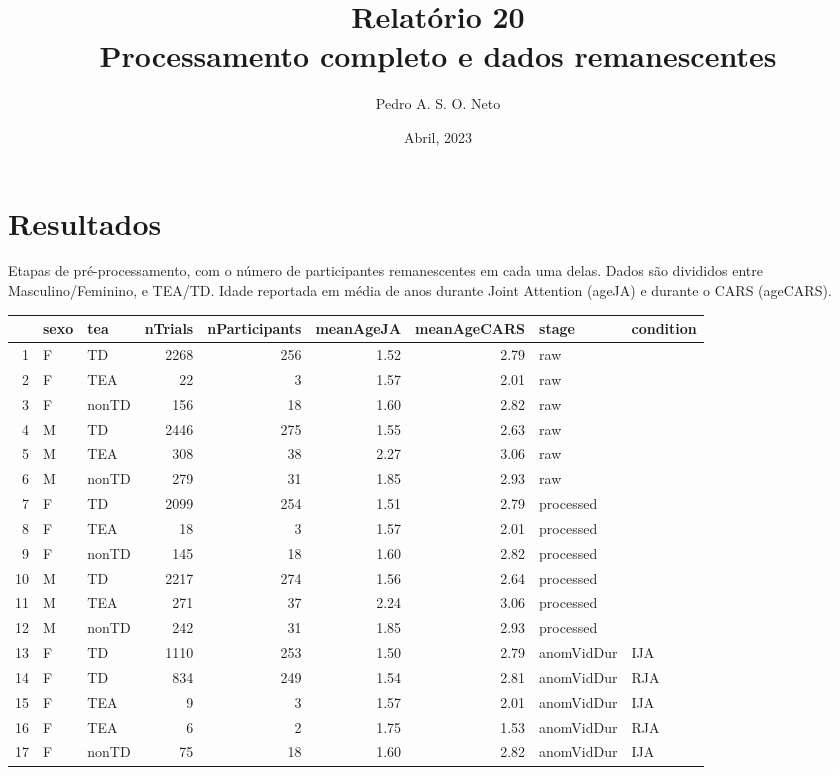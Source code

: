 \documentclass{article}
\title{Relatório 20 \\ Processamento completo e dados remanescentes}
\author{Pedro A. S. O. Neto}
\date{Abril, 2023}
\begin{document}
\maketitle

\section{Resultados}

Etapas de pré-processamento, com o número de participantes remanescentes em cada uma delas. Dados são divididos entre Masculino/Feminino, e TEA/TD. Idade reportada em média de anos durante Joint Attention (ageJA) e durante o CARS (ageCARS).
  \begin{table}[ht]
  \begin{tabular}{rllrrrrll}
    \hline
   & sexo & tea & nTrials & nParticipants & meanAgeJA & meanAgeCARS & stage & condition \\ 
    \hline
  1 & F & TD & 2268 & 256 & 1.52 & 2.79 & raw &  \\ 
    2 & F & TEA &  22 &   3 & 1.57 & 2.01 & raw &  \\ 
    3 & F & nonTD & 156 &  18 & 1.60 & 2.82 & raw &  \\ 
    4 & M & TD & 2446 & 275 & 1.55 & 2.63 & raw &  \\ 
    5 & M & TEA & 308 &  38 & 2.27 & 3.06 & raw &  \\ 
    6 & M & nonTD & 279 &  31 & 1.85 & 2.93 & raw &  \\ 
    7 & F & TD & 2099 & 254 & 1.51 & 2.79 & processed &  \\ 
    8 & F & TEA &  18 &   3 & 1.57 & 2.01 & processed &  \\ 
    9 & F & nonTD & 145 &  18 & 1.60 & 2.82 & processed &  \\ 
    10 & M & TD & 2217 & 274 & 1.56 & 2.64 & processed &  \\ 
    11 & M & TEA & 271 &  37 & 2.24 & 3.06 & processed &  \\ 
    12 & M & nonTD & 242 &  31 & 1.85 & 2.93 & processed &  \\ 
    13 & F & TD & 1110 & 253 & 1.50 & 2.79 & anomVidDur & IJA \\ 
    14 & F & TD & 834 & 249 & 1.54 & 2.81 & anomVidDur & RJA \\ 
    15 & F & TEA &   9 &   3 & 1.57 & 2.01 & anomVidDur & IJA \\ 
    16 & F & TEA &   6 &   2 & 1.75 & 1.53 & anomVidDur & RJA \\ 
    17 & F & nonTD &  75 &  18 & 1.60 & 2.82 & anomVidDur & IJA \\ 

\end{tabular}
\end{table}
\end{document}
